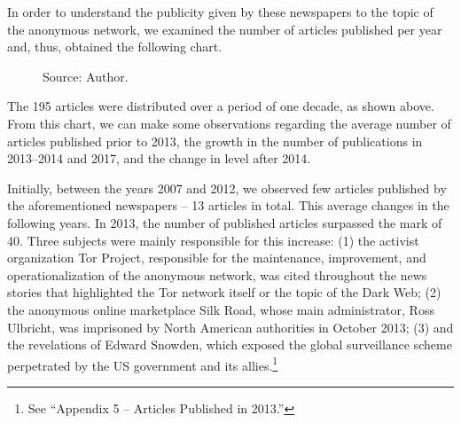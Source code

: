 In order to understand the publicity given by these newspapers to the topic of the anonymous network, we examined the number of articles published per year and, thus, obtained the following chart.

\begin{figure}[H]
\centering
{}
\caption*{Source: Author.}
\end{figure}

The 195 articles were distributed over a period of one decade, as shown above. From this chart, we can make some observations regarding the average number of articles published prior to 2013, the growth in the number of publications in 2013--2014 and 2017, and the change in level after 2014.

Initially, between the years 2007 and 2012, we observed few articles published by the aforementioned newspapers -- 13 articles in total. This average changes in the following years. In 2013, the number of published articles surpassed the mark of 40. Three subjects were mainly responsible for this increase: (1) the activist organization Tor Project, responsible for the maintenance, improvement, and operationalization of the anonymous network, was cited throughout the news stories that highlighted the Tor network itself or the topic of the Dark Web; (2) the anonymous online marketplace Silk Road, whose main administrator, Ross Ulbricht, was imprisoned by North American authorities in October 2013; (3) and the revelations of Edward Snowden, which exposed the global surveillance scheme perpetrated by the US government and its allies.\footnote{See ``Appendix 5 -- Articles Published in 2013.''}

